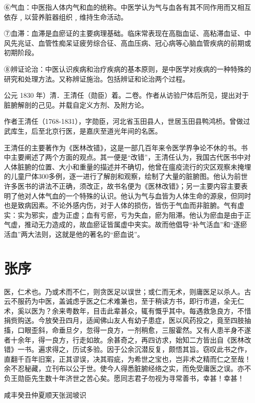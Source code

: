 \documentclass[a4paper,12pt,UTF8,twoside]{ctexbook}
\begin{document}
	⑥气血：中医指人体内气和血的统称。中医学认为气与血各有其不同作用而又相互依存﹐以营养脏器组织﹐维持生命活动。
	
	⑦血滞：血滞是血瘀证的主要病理基础。临床常表现在高脂血证、高粘滞血证、中风先兆证、血管性痴呆证疲劳综合征、高血压病、冠心病等心脑血管疾病的前期或初期阶段。
	
	⑧辨证论治：中医认识疾病和治疗疾病的基本原则，是中医学对疾病的一种特殊的研究和处理方法。又称辨证施治。包括辨证和论治两个过程。
	
	
	
	公元 1830 年）清．王清任（勋臣）着。二卷。作者从访验尸体后所见，提出对于脏腑解剖的己见。并载自定义方剂、及附方论。
	
	作者王清任（1768-1831），字勋臣，河北省玉田县人，世居玉田县鸭鸿桥。曾做过武库生，后至北京行医，是嘉庆至道光年间的名医。
	
	王清任的主要著作为《医林改错》，这是一部几百年来令医学界争论不休的书。书中主要阐述了两个方面的观点。其一便是“改错”，王清任认为，我国古代医书中对人体脏腑的位置、大小和重量的描述并不确切，他曾在瘟疫流行的灾区观察未掩埋的儿童尸体300多例，逐一进行了解剖和观察，绘制了大量的脏腑图。他认为前世许多医书的讲法不正确，须改正，故书名便为《医林改错》；另一主要内容主要表明了他对人体气血的一个特殊的认识。他认为气与血皆为人体生命的源泉，但同时也是致病因素。不论外感内伤，对于人体的损伤，皆伤于气血而非脏腑。气有虚实：实为邪实，虚为正虚；血有亏瘀，亏为失血，瘀为阻滞。他认为瘀血是由于正气虚，推动无力造成的，故血瘀证皆属虚中夹实。故而他倡导“补气活血”和“逐瘀活血”两大法则，这就是他的著名的“瘀血说”。
	
	\chapter{张序}
	医，仁术也。乃或术而不仁，则贪医足以误世；或仁而无术，则庸医足以杀人。古云不服药为中医，盖诚虑乎医之仁术难兼也，至于稍读方书，即行市道，全无仁术，奚以医为？余来粤数年，目击此辈甚众，辄有慨乎其中。每遇救急良方，不惜捐赀购送。今放癸丑四月，适闻佛山友人有幼子患症，医以风药投之，竟至四肢抽搐，口眼歪斜，命垂旦夕，忽得一良方，一剂稍愈，三服霍然。又有人患半身不遂者十余年，得一良方，行走如故。余甚奇之，再四访求，始知二方皆出自《医林改错》一书。遍求得之，历试多验。因于公余沉潜反复，颇悟其旨。窃叹此书之作，直翻千百年旧案，正其谬误，决其瑕疵，为希世之宝也，岂非术之精而仁之至哉！余不忍秘藏，立刊布以公于世。使今人得悉脏腑经络之实，而免受庸医之误。亦不负王勋臣先生数十年济世之苦心矣。愿同志君子勿视为寻常善书，幸甚！幸甚！
	
	咸丰癸丑仲夏顺天张润坡识
	
\end{document}
